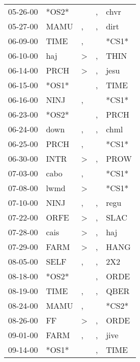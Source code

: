 \begin{supertabular}{lllll}
 05-26-00 &  *OS2* &                  &             , &   chvr \\
 05-27-00 &   MAMU &                , &             , &   dirt \\
 06-09-00 &   TIME &                , &               &  *CS1* \\
 06-10-00 &    haj &     \textgreater &             , &   THIN \\
 06-14-00 &   PRCH &     \textgreater &             , &   jesu \\
 06-15-00 &  *OS1* &                  &             , &   TIME \\
 06-16-00 &   NINJ &                , &               &  *CS1* \\
 06-23-00 &  *OS2* &                  &             , &   PRCH \\
 06-24-00 &   down &                , &             , &   chml \\
 06-25-00 &   PRCH &                , &               &  *CS1* \\
 06-30-00 &   INTR &     \textgreater &             , &   PROW \\
 07-03-00 &   cabo &                , &               &  *CS1* \\
 07-08-00 &   lwmd &     \textgreater &               &  *CS1* \\
 07-10-00 &   NINJ &                , &             , &   regu \\
 07-22-00 &   ORFE &     \textgreater &             , &   SLAC \\
 07-28-00 &   cais &     \textgreater &             , &    haj \\
 07-29-00 &   FARM &     \textgreater &             , &   HANG \\
 08-05-00 &   SELF &                , &             , &    2X2 \\
 08-18-00 &  *OS2* &                  &             , &   ORDE \\
 08-19-00 &   TIME &                , &             , &   QBER \\
 08-24-00 &   MAMU &                , &               &  *CS2* \\
 08-26-00 &     FF &     \textgreater &             , &   ORDE \\
 09-01-00 &   FARM &                , &             , &   jive \\
 09-14-00 &  *OS1* &                  &             , &   TIME \\

\end{supertabular}
